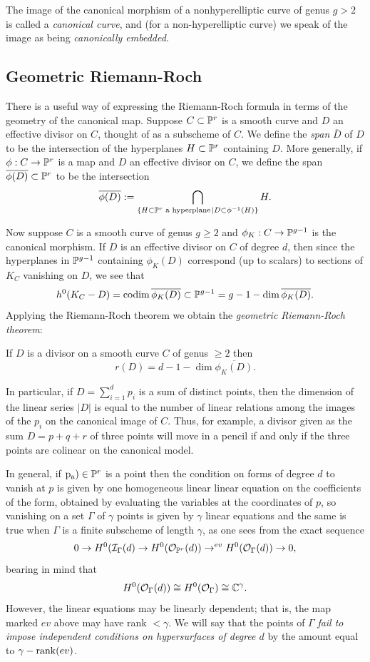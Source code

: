 The image of the canonical morphism of a nonhyperelliptic curve of genus $g>2$ is called a \emph{canonical curve}, and (for a non-hyperelliptic curve) we 
speak of the image as being \emph{canonically embedded}.


\subsection{Geometric Riemann-Roch}

There is a useful way of expressing the Riemann-Roch formula in terms of the geometry of the canonical map. Suppose $C \subset {\mathbb P}^r$ is a smooth curve and $D$ an effective divisor on $C$, thought of as a subscheme of $C$. We define the \emph{span} $\overline D$ of $D$ to be the intersection of the hyperplanes $H \subset {\mathbb P}^r$ containing $D$. More generally, if $\phi : C \to {\mathbb P}^r$ is a map and $D$ an effective divisor on $C$, we define the span $\overline{\phi(D)} \subset {\mathbb P}^r$ to be the intersection
$$
\overline{\phi(D)} := \bigcap_{ \{H \subset {\mathbb P}^r \text{ a hyperplane}\kern1pt \mid D \subset \phi^{-1}(H)\}} H.
$$

Now suppose $C$ is a smooth curve of genus $g\geq 2$ and $\phi_K: C\to {\mathbb P}^{g-1}$ is the canonical morphism.
If  $D$ is an effective divisor on $C$ of degree $d$, then since the hyperplanes in ${\mathbb P}^{g-1}$ containing $\phi_K(D)$ correspond (up to scalars) to sections of $K_C$ vanishing on $D$, we see that
$$
h^0(K_C-D) = \operatorname{codim} \overline{ \phi_K(D)} \subset {\mathbb P}^{g-1}= g - 1 - \dim \overline{ \phi_K(D)}.
$$
Applying the Riemann-Roch theorem we obtain  the \emph{geometric Riemann-Roch theorem}:

\begin{corollary}\label{geometric RR}
If $D$ is a divisor on a smooth curve $C$ of genus $\geq 2$ then
$$
r(D) = d - 1 - \dim \overline{ \phi_K(D)}.
$$
\end{corollary}

In particular, if $D = \sum_{i=1}^dp_i$ is a sum of distinct points, then
 the dimension of the linear series $|D|$  is equal to the number of linear relations among the images of the $p_i$ on the canonical 
 image of $C$. 
 Thus, for example, a divisor given as the sum $D = p+q+r$ of three points will move in a pencil if and only if the three points are colinear on the canonical model.

In general, if $\operatorname{\rm p_{a})}\in {\mathbb P}^r$ is a  point
 then the condition on forms of degree $d$ to vanish at $p$ is given by one homogeneous linear
 linear equation on the coefficients of the form, obtained by evaluating the variables at 
 the coordinates of $p$, so vanishing on a set $\Gamma$ of $\gamma$ points is given by
 $\gamma$ linear equations and the same is true when $\Gamma$ is a finite subscheme
 of length $\gamma$, as one sees from the exact sequence
 $$
 0\to H^0({\mathcal I}_\Gamma(d) \to H^0({\mathcal O}_{{\mathbb P}^r}(d)) \to^{ev} H^0({\mathcal O}_{\Gamma}(d)) \to 0,
 $$
 bearing in mind that 
 $$
 H^0({\mathcal O}_{\Gamma}(d)) \cong H^0({\mathcal O}_{\Gamma}) \cong {\mathbb C}^\gamma.
 $$
However, the linear equations may be linearly dependent; that is, the map marked $ev$
above may have rank $<\gamma$. We will say that the points of $\Gamma$
\emph{fail to impose independent conditions on hypersurfaces of degree $d$}
by the amount equal to $\gamma - \operatorname{rank}(ev)$. 

